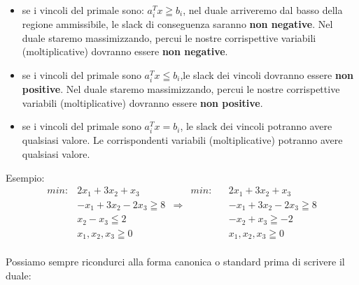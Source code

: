 \documentclass{article}
\begin{document}
\begin{center}
\end{center}
\begin{itemize}
\item se i vincoli del primale sono: \textbf{$a_i^Tx \geqq b_i$}, nel duale arriveremo dal basso della regione ammissibile, le slack di conseguenza saranno \textbf{non negative}. Nel duale staremo massimizzando, percui le nostre corrispettive variabili (moltiplicative) dovranno essere \textbf{non negative}.
\item se i vincoli del primale sono \textbf{$a_i^Tx \leqq b_i$},le slack dei vincoli dovranno essere \textbf{non positive}. Nel duale staremo massimizzando, percui le nostre corrispettive variabili (moltiplicative) dovranno essere \textbf{non positive}.
\item se i vincoli del primale sono \textbf{$a_i^Tx = b_i$}, le slack dei vincoli potranno avere qualsiasi valore. Le corrispondenti variabili (moltiplicative) potranno avere qualsiasi valore.
\end{itemize}

Esempio:\\

\begin{align*}
min: &2x_1 + 3x_2 + x_3      &              &          min:& &2x_1 + 3x_2 + x_3\\
&-x_1 + 3x_2 - 2x_3 \geqq 8  & \Rightarrow  &                & &-x_1 + 3x_2 - 2x_3 \geqq 8\\
&x_2 - x_3 \leqq 2           &              & 			     & &-x_2 + x_3 \geqq -2\\
&x_1, x_2,x_3 \geqq 0        &              & 				 & &x_1, x_2,x_3 \geqq 0\\
\end{align*}

Possiamo sempre ricondurci alla forma canonica o standard prima di scrivere il duale:
\begin{center}
\end{center}
\end{document}
